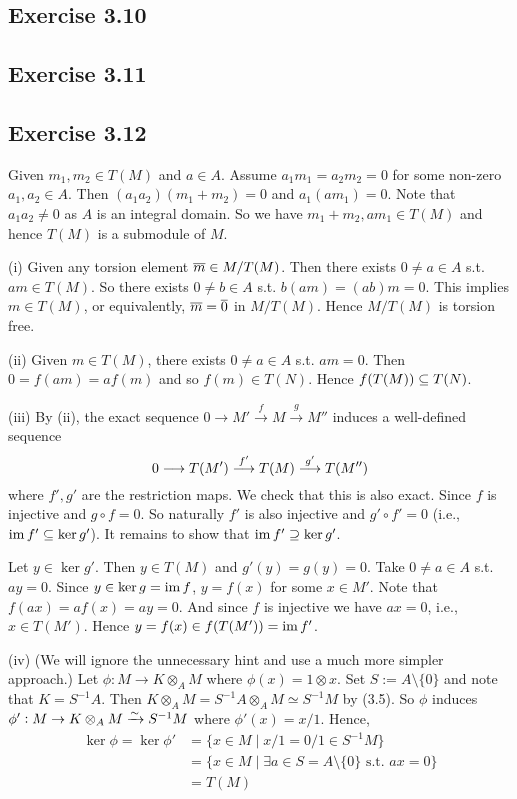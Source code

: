 \documentclass[../A&M.tex]{subfiles}
\begin{document}
\subsection*{Exercise 3.10}

\subsection*{Exercise 3.11}

\subsection*{Exercise 3.12}

Given $m_1,m_2\in T(M)$ and $a \in A$. Assume $a_1m_1=a_2m_2=0$ for some non-zero $a_1,a_2\in A$. Then $(a_1a_2)(m_1+m_2)=0$ and $a_1(am_1) = 0$. Note that $a_1a_2\neq 0$ as $A$ is an integral domain. So we have $m_1+m_2,am_1 \in T(M)$ and hence $T(M)$ is a submodule of $M$.

(i) Given any torsion element $\overline{m} \in M/T(M)$. Then there exists $0\neq a\in A$ s.t. $am \in T(M)$. So there exists $0\neq b\in A$ s.t. $b(am) = (ab)m = 0$. This implies $m \in T(M)$, or equivalently, $\overline{m} = \overline{0}$ in $M/T(M)$. Hence $M/T(M)$ is torsion free.

(ii) Given $m\in T(M)$, there exists $0\neq a\in A$ s.t. $am=0$. Then $0=f(am)=af(m)$ and so $f(m) \in T(N)$. Hence $f(T(M)) \subseteq T(N)$.

(iii) By (ii), the exact sequence $0 \to M' \overset{f}{\to} M \overset{g}{\to} M''$ induces a well-defined sequence
$$
0 \longrightarrow T(M') \overset{f'}{\longrightarrow} T(M) \overset{g'}{\longrightarrow} T(M'')
$$
where $f',g'$ are the restriction maps. We check that this is also exact. Since $f$ is injective and $g\circ f = 0$. So naturally $f'$ is also injective and $g' \circ f' = 0$ (i.e., $\operatorname{im} f' \subseteq \ker g'$). It remains to show that $\operatorname{im} f' \supseteq \ker g'$.

Let $y\in \ker g'$. Then $y\in T(M)$ and $g'(y)=g(y)=0$. Take $0\neq a \in A$ s.t. $ay = 0$. Since $y \in \ker g = \operatorname{im} f$, $y = f(x)$ for some $x\in M'$. Note that $f(ax) = af(x) = ay = 0$. And since $f$ is injective we have $ax=0$, i.e., $x\in T(M')$. Hence $y = f(x) \in f(T(M')) = \operatorname{im} f'$.

(iv) (We will ignore the unnecessary hint and use a much more simpler approach.) Let $\phi: M \to K \otimes_A M$ where $\phi(x) = 1 \otimes x$. Set $S := A \setminus \{0\}$ and note that $K = S^{-1}A$. Then $K \otimes_A M = S^{-1}A \otimes_A M \simeq S^{-1}M$ by (3.5). So $\phi$ induces $\phi' : M \to K \otimes_A M \xrightarrow{\sim} S^{-1}M$ where $\phi'(x) = x/1$. Hence,
\begin{align*}
\ker \phi
= \ker \phi' 
&= \{ x \in M \mid x/1 = 0/1 \in S^{-1}M \}   \\
&= \{ x \in M \mid \exists a\in S = A \setminus \{0\} \text{ s.t. } ax = 0 \}   \\
&= T(M)
\end{align*}
\end{document}
